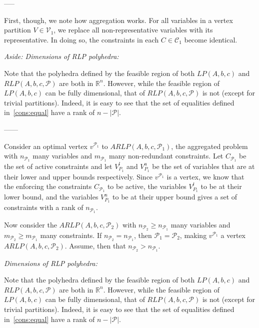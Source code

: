\documentclass[runningheads]{llncs}
\newcommand{\cP}{{\mathcal P}}
\newcommand{\cC}{{\mathcal C}}
\newcommand{\cV}{{\mathcal V}}
\begin{document}
 -----
 



First, though, we note how aggregation works. For all variables in a vertex partition $V \in \cV_1$, we replace all non-representative variables with its representative. In doing so, the constraints in each $C \in \cC_1$ become identical. 

{\em Aside: Dimensions of RLP polyhedra:}

Note that the polyhedra defined by the feasible region of both $LP(A,b,c)$ and
$RLP(A,b,c,\cP)$ are both in $\mathbb{R}^n$. However, while the feasible
region of $LP(A,b,c)$ can be fully dimensional, that of $RLP(A,b,c,\cP)$ is not
(except for trivial partitions). Indeed, it is easy to see that the set of
equalities defined in~\eqref{cons:equal} have a rank of $n - |\cP|$.


------



Consider an optimal vertex $v^{\cP_1}$ to $ARLP(A,b,c,\cP_1)$, the aggregated problem with $n_{\cP_1}$ many variables and $m_{\cP_1}$ many non-redundant constraints. Let $C_{\cP_1}$ be the set of active constraints and let $V_{P_1}^l$ and  $V_{P_1}^u$ be the set of variables that are at their lower and upper bounds respectively. Since $v^{\cP_1}$ is a vertex, we know that the enforcing the constraints $C_{\cP_1}$ to be active, the variables $V_{P_1}^l$ to be at their lower bound, and the variables $V_{P_1}^u$ to be at their upper bound gives a set of constraints with a rank of $n_{\cP_1}$.







Now consider the $ARLP(A,b,c,\cP_2)$ with $n_{\cP_2} \geq n_{\cP_1}$ many variables and $m_{\cP_2}\geq m_{\cP_1}$ many constraints. If $n_{\cP_2} = n_{\cP_1}$, then $\cP_1 = \cP_2$, making $v^{\cP_1}$  a vertex $ARLP(A,b,c,\cP_2)$. Assume, then that $n_{\cP_2} > n_{\cP_1}$. 
















{\em Dimensions of RLP polyhedra:}

Note that the polyhedra defined by the feasible region of both $LP(A,b,c)$ and
$RLP(A,b,c,\cP)$ are both in $\mathbb{R}^n$. However, while the feasible
region of $LP(A,b,c)$ can be fully dimensional, that of $RLP(A,b,c,\cP)$ is not
(except for trivial partitions). Indeed, it is easy to see that the set of
equalities defined in~\eqref{cons:equal} have a rank of $n - |\cP|$.
\end{document}
